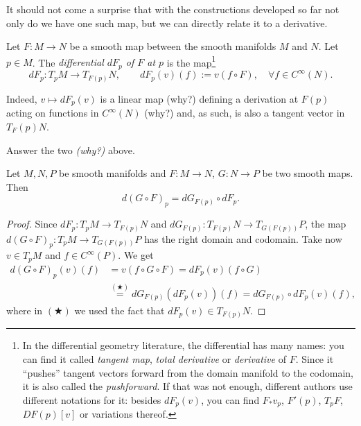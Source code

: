 It should not come a surprise that with the constructions developed so far not only do we have one such map, but we can directly relate it to a derivative.

\begin{definition}\label{def:differentialMap}
  Let $F: M \to N$ be a smooth map between the smooth manifolds $M$ and $N$.
  Let $p\in M$. The \emph{differential $d F_p$ of $F$ at $p$} is the map\footnote{In the differential geometry literature, the differential has many names: you can find it called \emph{tangent map}, \emph{total derivative} or \emph{derivative} of $F$. Since it ``pushes'' tangent vectors forward from the domain manifold to the codomain, it is also called the \emph{pushforward}. If that was not enough, different authors use different notations for it: besides $dF_p(v)$, you can find $F_* v_p$, $F'(p)$, $T_pF$, $DF(p)[v]$ or variations thereof.}
  \begin{equation}
    d F_p : T_p M \to T_{F(p)} N, \qquad d F_p (v) (f) := v(f\circ F), \quad \forall f\in C^\infty(N).
  \end{equation}  
\end{definition}

Indeed, $v \mapsto d F_p (v)$ is a linear map (why?) defining a derivation at $F(p)$ acting on functions in $C^\infty(N)$ (why?) and, as such, is also a tangent vector in $T_F(p)N$.

\begin{exercise}
  Answer the two \emph{(why?)} above.
\end{exercise}

\begin{theorem}\label{thm:chainrule_mfld}
  Let $M, N, P$ be smooth manifolds and $F: M \to N$, $G: N\to P$ be two smooth maps. Then
  \begin{equation}
    d(G\circ F)_p = dG_{F(p)} \circ dF_p.
  \end{equation}
\end{theorem}
\begin{proof}
  Since $dF_p : T_p M \to T_{F(p)}N$ and $dG_{F(p)}: T_{F(p)}N \to T_{G(F(p))}P$, the map $d(G\circ F)_p: T_p M \to T_{G(F(p))}P$ has the right domain and codomain.
  Take now $v\in T_p M$ and $f\in C^\infty(P)$. We get
  \begin{align}
    d(G\circ F)_p(v)(f) &= v(f\circ G \circ F)
    = dF_p (v)(f\circ G) \\
    &\stackrel{(\bigstar)}{=} dG_{F(p)}(dF_p (v))(f)
    = dG_{F(p)} \circ dF_p (v)(f),
  \end{align}
  where in $(\bigstar)$ we used the fact that $dF_p (v)\in T_{F(p)}N$.
\end{proof}

